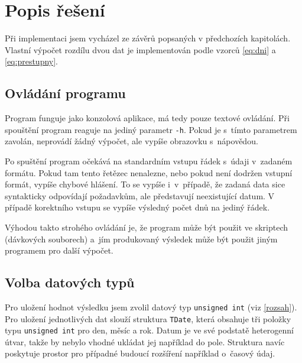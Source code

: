 \documentclass[12pt,a4paper,titlepage,final]{article}
\begin{document}
\section{Popis řešení} \label{reseni}

Při implementaci jsem vycházel ze závěrů popsaných v předchozích kapitolách.
Vlastní výpočet rozdílu dvou dat je implementován podle vzorců \ref{eq:dni} a
\ref{eq:prestupny}.

\subsection{Ovládání programu}

Program funguje jako konzolová aplikace, má tedy pouze textové ovládání. Při
spouštění program reaguje na jediný parametr \texttt{-h}. Pokud je s~tímto
parametrem zavolán, neprovádí žádný výpočet, ale vypíše obrazovku s~nápovědou.

Po spuštění program očekává na standardním vstupu řádek s~údaji v~zadaném
formátu. Pokud tam tento řetězec nenalezne, nebo pokud není dodržen vstupní
formát, vypíše chybové hlášení. To se vypíše i~v~případě, že zadaná data sice
syntakticky odpovídají požadavkům, ale představují neexistující datum. V
případě korektního vstupu se vypíše výsledný počet dnů na jediný řádek.

Výhodou takto strohého ovládání je, že program může být použit ve skriptech
(dávkových souborech) a~jím produkovaný výsledek může být použit jiným
programem pro další výpočet.

\subsection{Volba datových typů}

Pro uložení hodnot výsledku jsem zvolil datový typ \texttt{unsigned int} (viz
\ref{rozsah}). Pro uložení jednotlivých dat slouží struktura \texttt{TDate},
která obsahuje tři položky typu \texttt{unsigned int} pro den, měsíc a rok.
Datum je ve své podstatě heterogenní útvar, takže by nebylo vhodné ukládat jej
například do pole. Struktura navíc poskytuje prostor pro případné budoucí
rozšíření například o~časový údaj.
\end{document}
